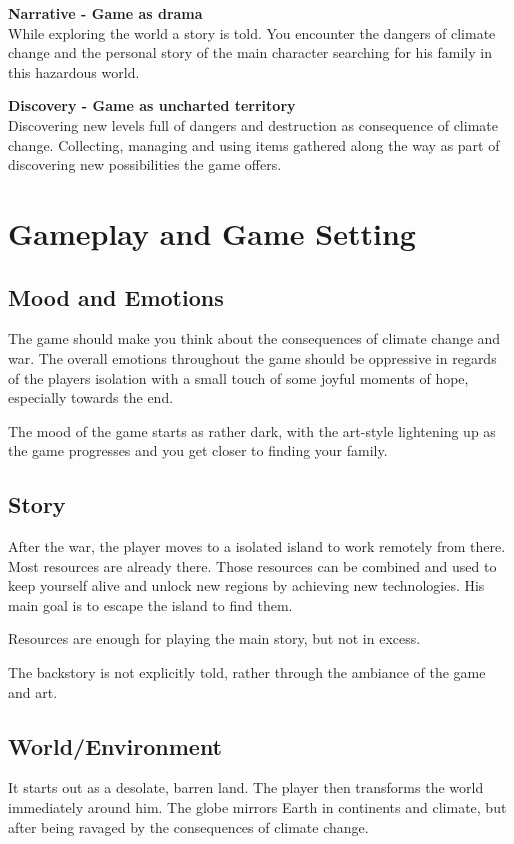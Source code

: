 \documentclass[a4paper]{scrreprt}
\begin{document}
\textbf{Narrative - Game as drama}\\[4pt]
While exploring the world a story is told. You encounter the dangers of climate change
and the personal story of the main character searching for his family in this hazardous world.

\textbf{Discovery - Game as uncharted territory}\\[4pt]
Discovering new levels full of dangers and destruction as consequence of climate change. Collecting, managing and using items gathered along the way as part of discovering new possibilities the game offers.



\chapter{Gameplay and Game Setting}

\section{Mood and Emotions}
The game should make you think about the consequences of climate change and war. The overall emotions throughout the game should be oppressive in regards of the players isolation with a small touch of some joyful moments of hope, especially towards the end.

The mood of the game starts as rather dark, with the art-style lightening up as the game progresses and you get closer to finding your family.

\section{Story}
After the war, the player moves to a isolated island to work remotely from there. Most resources are already there. Those resources can be combined and used to keep yourself alive and unlock new regions by achieving new technologies. His main goal is to escape the island to find them.

Resources are enough for playing the main story, but not in excess.

The backstory is not explicitly told, rather through the ambiance of the game and art.

\section{World/Environment}
It starts out as a desolate, barren land. The player then transforms the world immediately around him. The globe mirrors Earth in continents and climate, but after being ravaged by the consequences of climate change.
\end{document}
